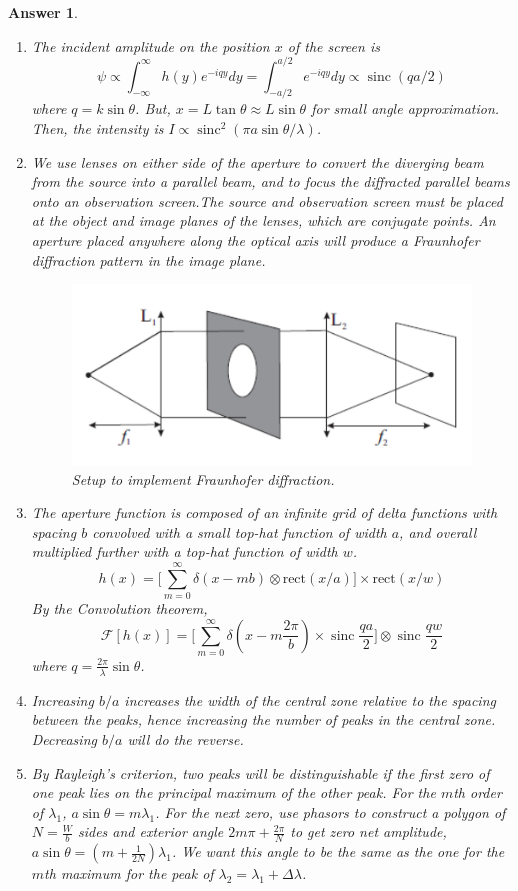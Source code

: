 \documentclass[a4paper]{article}
\DeclareMathOperator{\sinc}{sinc}
\newtheorem{ans}{Answer}[subsection]
\theoremstyle{new}
\begin{document}
\begin{ans}\leavevmode
\begin{enumerate}[label=(\roman*)]
\item The incident amplitude on the position $x$ of the screen is
$$\psi\propto\int_{-\infty}^\infty h(y)e^{-iqy}dy=\int_{-a/2}^{a/2}e^{-iqy}dy\propto\sinc(qa/2)$$
where $q=k\sin\theta$. But, $x=L\tan\theta\approx L\sin\theta$ for small angle approximation. Then, the intensity is $I\propto\sinc^2(\pi a\sin\theta/\lambda)$.
\item We use lenses on either side of the aperture to convert the diverging beam from the source into a parallel beam, and to focus the diffracted parallel beams onto an observation screen.The source and observation screen must be placed at the object and image planes of the lenses, which are conjugate points. An aperture placed anywhere along the optical axis will produce a Fraunhofer diffraction pattern in the image plane.
\begin{figure}[H]
    \centering
    \includegraphics[scale=0.5]{fraunhoferlimit.PNG}
    \caption{Setup to implement Fraunhofer diffraction.}
\end{figure}
\item The aperture function is composed of an infinite grid of delta functions with spacing $b$ convolved with a small top-hat function of width $a$, and overall multiplied further with a top-hat function of width $w$.
$$h(x)=\bigg[\sum_{m=0}^\infty \delta(x-mb)\otimes\text{rect}(x/a)\bigg]\times\text{rect}(x/w)$$
By the Convolution theorem,
$$\mathcal{F}[h(x)]=\bigg[\sum_{m=0}^\infty\delta(x-m\frac{2\pi}{b})\times\sinc\frac{qa}{2}\bigg]\otimes\sinc\frac{qw}{2}$$
where $q=\frac{2\pi}{\lambda}\sin\theta$.
\item Increasing $b/a$ increases the width of the central zone relative to the spacing between the peaks, hence increasing the number of peaks in the central zone. Decreasing $b/a$ will do the reverse.
\item By Rayleigh's criterion, two peaks will be distinguishable if the first zero of one peak lies on the principal maximum of the other peak. For the $m$th order of $\lambda_1$, $a\sin\theta=m\lambda_1$. For the next zero, use phasors to construct a polygon of $N=\frac{W}{b}$ sides and exterior angle $2m\pi+\frac{2\pi}{N}$ to get zero net amplitude, $a\sin\theta=(m+\frac{1}{2N})\lambda_1$. We want this angle to be the same as the one for the $m$th maximum for the peak of $\lambda_2=\lambda_1+\Delta\lambda$.

\end{enumerate}
\end{ans}
\end{document}
